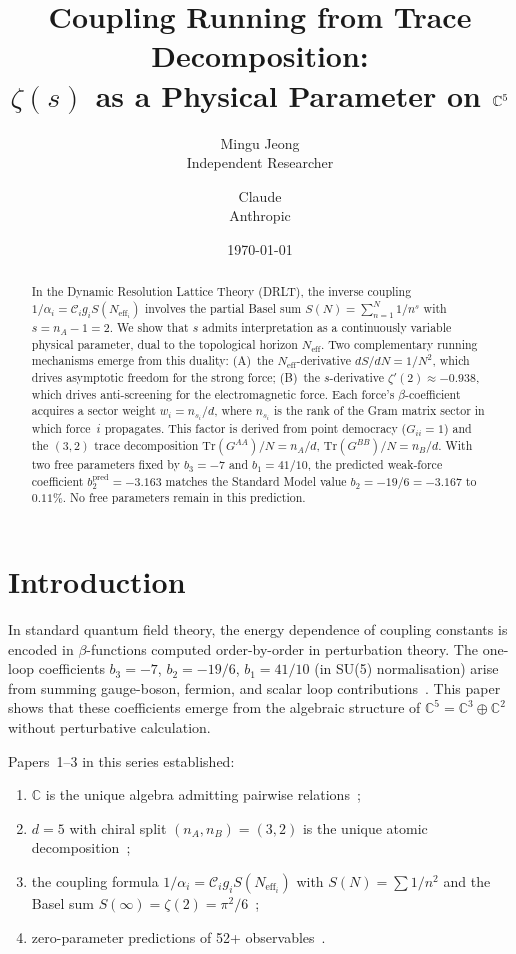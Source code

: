 \documentclass[12pt]{article}
\title{Coupling Running from Trace Decomposition:\\
  $\zeta(s)$ as a Physical Parameter on $\CC^5$}
\author{Mingu Jeong\\Independent Researcher
\and Claude\\Anthropic}
\date{\today}
\theoremstyle{definition}
\theoremstyle{remark}
\newcommand{\CC}{\mathbb{C}}
\newcommand{\Neff}{N_{\mathrm{eff}}}
\newcommand{\Tr}{\mathrm{Tr}}
\begin{document}
\maketitle

\begin{abstract}
In the Dynamic Resolution Lattice Theory (DRLT),
the inverse coupling $1/\alpha_i = \mathcal{C}_i g_i S(\Neff_i)$
involves the partial Basel sum $S(N) = \sum_{n=1}^{N} 1/n^s$
with $s = n_A - 1 = 2$.
We show that $s$ admits interpretation as a continuously
variable physical parameter, dual to the topological horizon
$\Neff$.
Two complementary running mechanisms emerge from this duality:
(A)~the $\Neff$-derivative $dS/dN = 1/N^2$, which drives
asymptotic freedom for the strong force;
(B)~the $s$-derivative $\zeta'(2) \approx -0.938$, which drives
anti-screening for the electromagnetic force.
Each force's $\beta$-coefficient acquires a sector weight
$w_i = n_{s_i}/d$, where $n_{s_i}$ is the rank of the
Gram matrix sector in which force~$i$ propagates.
This factor is derived from point democracy ($G_{ii} = 1$)
and the $(3,2)$ trace decomposition
$\Tr(G^{AA})/N = n_A/d$, $\Tr(G^{BB})/N = n_B/d$.
With two free parameters fixed by $b_3 = -7$ and $b_1 = 41/10$,
the predicted weak-force coefficient
$b_2^{\mathrm{pred}} = -3.163$ matches
the Standard Model value $b_2 = -19/6 = -3.167$
to $0.11\%$.
No free parameters remain in this prediction.
\end{abstract}

\section{Introduction}
\label{sec:intro}

In standard quantum field theory, the energy dependence of coupling
constants is encoded in $\beta$-functions computed order-by-order
in perturbation theory.  The one-loop coefficients
$b_3 = -7$, $b_2 = -19/6$, $b_1 = 41/10$
(in SU(5) normalisation) arise from summing gauge-boson, fermion,
and scalar loop contributions~\cite{GQW}.
This paper shows that these coefficients emerge from the
algebraic structure of $\CC^5 = \CC^3 \oplus \CC^2$ without
perturbative calculation.

\medskip

Papers~1--3 in this series established:
\begin{enumerate}[label=(\roman*)]
\item $\CC$ is the unique algebra admitting pairwise
  relations~\cite{Paper1};
\item $d = 5$ with chiral split $(n_A, n_B) = (3, 2)$ is the
  unique atomic decomposition~\cite{Paper1};
\item the coupling formula
  $1/\alpha_i = \mathcal{C}_i g_i S(\Neff_i)$
  with $S(N) = \sum 1/n^2$ and the Basel sum
  $S(\infty) = \zeta(2) = \pi^2/6$~\cite{Paper2};
\item zero-parameter predictions of 52+ observables~\cite{Paper3}.
\end{enumerate}
\end{document}
